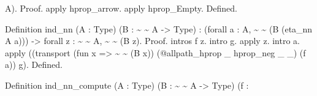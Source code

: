 \begin{coqdoccode}
\begin{coqdoccomment}
A).\coqdoceol
Proof.\coqdoceol
\coqdocindent{1.00em}
apply\coqdocindent{0.50em}
hprop\_arrow.\coqdocindent{0.50em}
apply\coqdocindent{0.50em}
hprop\_Empty.\coqdoceol
Defined.\coqdoceol
\end{coqdoccomment}
\coqdoceol
\coqdocemptyline
\coqdocnoindent
\begin{coqdoccomment}
\coqdoceol
Definition\coqdocindent{0.50em}
ind\_nn\coqdocindent{0.50em}
(A\coqdocindent{0.50em}
:\coqdocindent{0.50em}
Type)\coqdocindent{0.50em}
(B\coqdocindent{0.50em}
:\coqdocindent{0.50em}
\~{}\coqdocindent{0.50em}
\~{}\coqdocindent{0.50em}
A\coqdocindent{0.50em}
->\coqdocindent{0.50em}
Type)\coqdocindent{0.50em}
:\coqdocindent{0.50em}
\coqdoceol
\coqdocindent{1.00em}
(forall\coqdocindent{0.50em}
a\coqdocindent{0.50em}
:\coqdocindent{0.50em}
A,\coqdocindent{0.50em}
\~{}\coqdocindent{0.50em}
\~{}\coqdocindent{0.50em}
(B\coqdocindent{0.50em}
(eta\_nn\coqdocindent{0.50em}
A\coqdocindent{0.50em}
a)))\coqdocindent{0.50em}
->\coqdocindent{0.50em}
forall\coqdocindent{0.50em}
z\coqdocindent{0.50em}
:\coqdocindent{0.50em}
\~{}\coqdocindent{0.50em}
\~{}\coqdocindent{0.50em}
A,\coqdocindent{0.50em}
\~{}\coqdocindent{0.50em}
\~{}\coqdocindent{0.50em}
(B\coqdocindent{0.50em}
z).\coqdocindent{0.50em}
\coqdoceol
Proof.\coqdoceol
\coqdocindent{1.00em}
intros\coqdocindent{0.50em}
f\coqdocindent{0.50em}
z.\coqdocindent{0.50em}
intro\coqdocindent{0.50em}
g.\coqdoceol
\coqdocindent{1.00em}
apply\coqdocindent{0.50em}
z.\coqdocindent{0.50em}
intro\coqdocindent{0.50em}
a.\coqdoceol
\coqdocindent{1.00em}
apply\coqdocindent{0.50em}
((transport\coqdocindent{0.50em}
(fun\coqdocindent{0.50em}
x\coqdocindent{0.50em}
=>\coqdocindent{0.50em}
\~{}\coqdocindent{0.50em}
\~{}\coqdocindent{0.50em}
(B\coqdocindent{0.50em}
x))\coqdocindent{0.50em}
\coqdoceol
\coqdocindent{10.00em}
(@allpath\_hprop\coqdocindent{0.50em}
\_\coqdocindent{0.50em}
hprop\_neg\coqdocindent{0.50em}
\_\coqdocindent{0.50em}
\_)\coqdoceol
\coqdocindent{10.00em}
(f\coqdocindent{0.50em}
a))\coqdocindent{0.50em}
g).\coqdoceol
Defined.\coqdoceol
\end{coqdoccomment}
\coqdoceol
\coqdocemptyline
\coqdocnoindent
\begin{coqdoccomment}
\coqdoceol
Definition\coqdocindent{0.50em}
ind\_nn\_compute\coqdocindent{0.50em}
(A\coqdocindent{0.50em}
:\coqdocindent{0.50em}
Type)\coqdocindent{0.50em}
(B\coqdocindent{0.50em}
:\coqdocindent{0.50em}
\~{}\coqdocindent{0.50em}
\~{}\coqdocindent{0.50em}
A\coqdocindent{0.50em}
->\coqdocindent{0.50em}
Type)\coqdoceol
\coqdocindent{1.50em}
(f\coqdocindent{0.50em}
:\coqdocindent{0.50em}

\end{coqdoccomment}
\end{coqdoccode}
